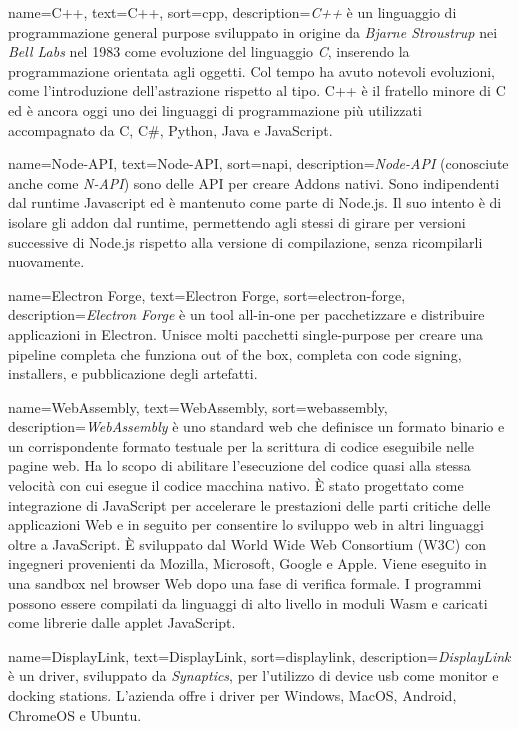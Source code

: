  {
    name=C++,
    text=C++,
    sort=cpp,
    description={\emph{C++} è un linguaggio di programmazione general purpose sviluppato in origine da \emph{Bjarne Stroustrup} nei \emph{Bell Labs} nel 1983 come evoluzione del linguaggio \emph{C}, inserendo la programmazione orientata agli oggetti. Col tempo ha avuto notevoli evoluzioni, come l'introduzione dell'astrazione rispetto al tipo.
    C++ è il fratello minore di C ed è ancora oggi uno dei linguaggi di programmazione più utilizzati accompagnato da C, C#, Python, Java e JavaScript.}
}

 {
    name=Node-API,
    text=Node-API,
    sort=napi,
    description={\emph{Node-API} (conosciute anche come \emph{N-API}) sono delle API per creare Addons nativi. Sono indipendenti dal runtime Javascript ed è mantenuto come parte di Node.js. Il suo intento è di isolare gli addon dal runtime, permettendo agli stessi di girare per versioni successive di Node.js rispetto alla versione di compilazione, senza ricompilarli nuovamente.}
}

 {
    name=Electron Forge,
    text=Electron Forge,
    sort=electron-forge,
    description={\emph{Electron Forge} è un tool all-in-one per pacchetizzare e distribuire applicazioni in Electron. Unisce molti pacchetti single-purpose per creare una pipeline completa che funziona out of the box, completa con code signing, installers, e pubblicazione degli artefatti.}
}

 {
    name=WebAssembly,
    text=WebAssembly,
    sort=webassembly,
    description={\emph{WebAssembly} è uno standard web che definisce un formato binario e un corrispondente formato testuale per la scrittura di codice eseguibile nelle pagine web. Ha lo scopo di abilitare l'esecuzione del codice quasi alla stessa velocità con cui esegue il codice macchina nativo. È stato progettato come integrazione di JavaScript per accelerare le prestazioni delle parti critiche delle applicazioni Web e in seguito per consentire lo sviluppo web in altri linguaggi oltre a JavaScript. È sviluppato dal World Wide Web Consortium (W3C) con ingegneri provenienti da Mozilla, Microsoft, Google e Apple. Viene eseguito in una sandbox nel browser Web dopo una fase di verifica formale. I programmi possono essere compilati da linguaggi di alto livello in moduli Wasm e caricati come librerie dalle applet JavaScript.}
}

 {
    name=DisplayLink,
    text=DisplayLink,
    sort=displaylink,
    description={\emph{DisplayLink} è un driver, sviluppato da \emph{Synaptics}, per l'utilizzo di device usb come monitor e docking stations. L'azienda offre i driver per Windows, MacOS, Android, ChromeOS e Ubuntu.}
}